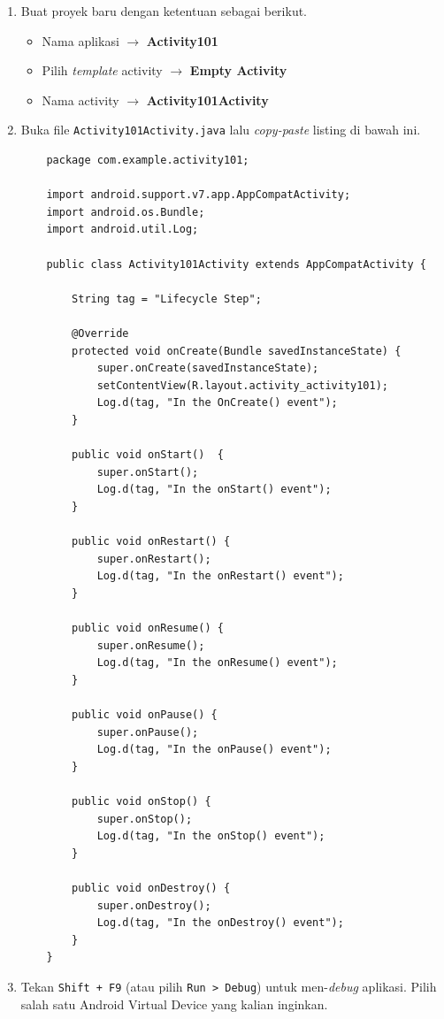 \documentclass{scrartcl}
\begin{document}
\begin{enumerate}
	\item Buat proyek baru dengan ketentuan sebagai berikut.
	\begin{itemize}
		\item Nama aplikasi $\rightarrow$ \textbf{Activity101}
		\item Pilih \textit{template} activity $\rightarrow$ \textbf{Empty Activity}
		\item Nama activity $\rightarrow$ \textbf{Activity101Activity}
	\end{itemize}

	\item Buka file \texttt{Activity101Activity.java} lalu \textit{copy-paste} listing di bawah ini.
	
	\begin{verbatim}
	package com.example.activity101;
	
	import android.support.v7.app.AppCompatActivity;
	import android.os.Bundle;
	import android.util.Log;
	
	public class Activity101Activity extends AppCompatActivity {
	
		String tag = "Lifecycle Step";
		
		@Override
		protected void onCreate(Bundle savedInstanceState) {
			super.onCreate(savedInstanceState);
			setContentView(R.layout.activity_activity101);
			Log.d(tag, "In the OnCreate() event");
		}
		
		public void onStart()  {
			super.onStart();
			Log.d(tag, "In the onStart() event");
		}
	
		public void onRestart() {
			super.onRestart();
			Log.d(tag, "In the onRestart() event");
		}
	
		public void onResume() {
			super.onResume();
			Log.d(tag, "In the onResume() event");
		}
	
		public void onPause() {
			super.onPause();
			Log.d(tag, "In the onPause() event");
		}
		
		public void onStop() {
			super.onStop();
			Log.d(tag, "In the onStop() event");
		}
	
		public void onDestroy() {
			super.onDestroy();
			Log.d(tag, "In the onDestroy() event");
		}
	}
	\end{verbatim}

	\item Tekan \texttt{Shift + F9} (atau pilih \texttt{Run > Debug}) untuk men-\textit{debug} aplikasi. Pilih salah satu Android Virtual Device yang kalian inginkan.
	

\end{enumerate}
\end{document}
